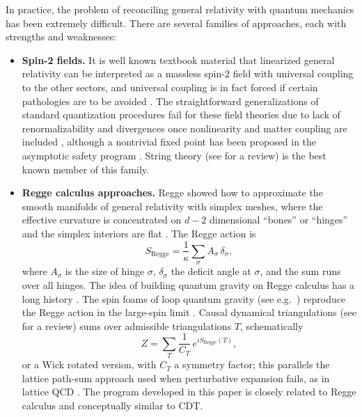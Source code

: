 \documentclass[11pt,letterpaper]{article}
\begin{document}
In practice, the problem of reconciling general relativity with quantum mechanics has been extremely difficult. There are several families of approaches, each with strengths and weaknesses:
\begin{itemize}
\item \textbf{Spin-2 fields.} It is well known textbook material \cite{Wald,Carroll} that linearized general relativity can be interpreted as a massless spin-2 field with universal coupling to the other sectors, and universal coupling is in fact forced if certain pathologies are to be avoided \cite{Weinberg1965}. The straightforward generalizations of standard quantization procedures fail for these field theories due to lack of renormalizability and divergences once nonlinearity and matter coupling are included \cite{tHooftVeltman,GoroffSagnotti}, although a nontrivial fixed point has been proposed in the asymptotic safety program \cite{Weinberg1979,Eichhorn}. String theory (see \cite{Mukhi} for a review) is the best known member of this family.
\item \textbf{Regge calculus approaches.} Regge showed how to approximate the smooth manifolds of general relativity with simplex meshes, where the effective curvature is concentrated on $d-2$ dimensional ``bones'' or ``hinges'' and the simplex interiors are flat \cite{Regge}. The Regge action is
\begin{equation}
S_{\mathrm{Regge}}=\frac{1}{\kappa}\sum_{\sigma}A_{\sigma}\,\delta_{\sigma},
\label{eq:regge}
\end{equation}
where $A_{\sigma}$ is the size of hinge $\sigma$, $\delta_{\sigma}$ the deficit angle at $\sigma$, and the sum runs over all hinges. The idea of building quantum gravity on Regge calculus has a long history \cite{RocekWilliams,Williams1992,WilliamsTuckey}. The spin foams of loop quantum gravity (see e.g.\ \cite{RovelliVidotto}) reproduce the Regge action in the large-spin limit \cite{BarrettWilliams,BianchiModesto,ConradyFreidel}. Causal dynamical triangulations (see \cite{Loll} for a review) sums over admissible triangulations $T$, schematically
\begin{equation}
Z=\sum_{T}\frac{1}{C_{T}}\,e^{iS_{\mathrm{Regge}}(T)},
\label{eq:cdt}
\end{equation}
or a Wick rotated version, with $C_{T}$ a symmetry factor; this parallels the lattice path-sum approach used when perturbative expansion fails, as in lattice QCD \cite{Wilson}. The program developed in this paper is closely related to Regge calculus and conceptually similar to CDT.

\end{itemize}
\end{document}
